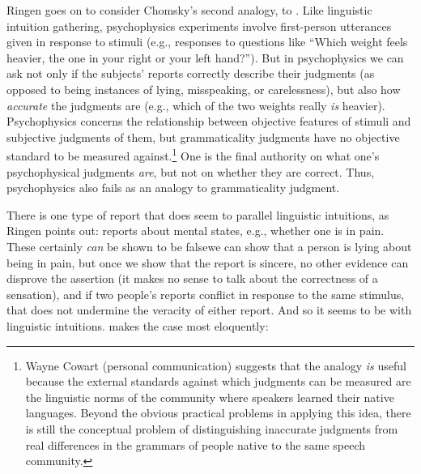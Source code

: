 Ringen goes on to consider Chomsky's second analogy, to . Like linguistic intuition gathering, psychophysics experiments involve first-person utterances given in response to stimuli (e.g., responses to questions like ``Which weight feels heavier, the one in your right or your left hand?''). But in psychophysics we can ask not only if the subjects' reports correctly describe their judgments (as opposed to being instances of lying, misspeaking, or carelessness), but also how \textit{accurate} the judgments are (e.g., which of the two weights really \textit{is} heavier). Psychophysics concerns the relationship between objective features of stimuli and subjective judgments of them, but grammaticality judgments have no objective standard to be measured against.\footnote{Wayne Cowart (personal communication) suggests that the analogy \textit{is} useful because the external standards against which judgments can be measured are the linguistic norms of the community where speakers learned their native languages. Beyond the obvious practical problems in applying this idea, there is still the conceptual problem of distinguishing inaccurate judgments from real differences in the grammars of people native to the same speech community.
}
 One is the final authority on what one's psychophysical judgments \textit{are}, but not on whether they are correct. Thus, psychophysics also fails as an analogy to grammaticality judgment.

There is one type of report that does seem to parallel linguistic intuitions, as Ringen points out: reports about mental states, e.g., whether one is in pain. These certainly \textit{can} be shown to be false\schdash{}we can show that a person is lying about being in pain, but once we show that the report is sincere, no other evidence can
disprove the assertion (it makes no sense to talk about the correctness of a sensation), and if two people's reports conflict in response to the same stimulus, that does not undermine the veracity of either report. And so it seems to be with linguistic intuitions. \citet{Pateman1987} makes the case most eloquently:

